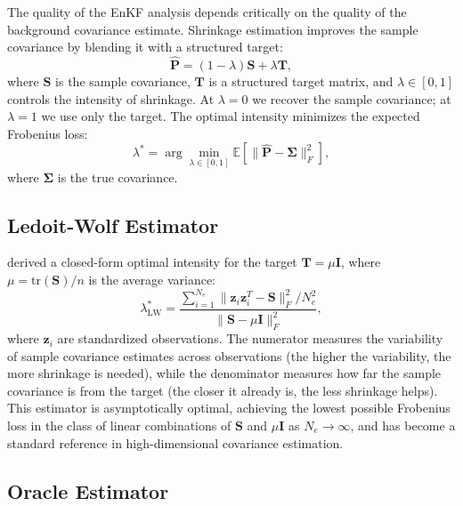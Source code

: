 The quality of the EnKF analysis depends critically on the quality of the background covariance estimate. Shrinkage estimation improves the sample covariance by blending it with a structured target:
\begin{equation}
\label{eq:shrinkage_cov}
\hat{\mathbf{P}} = (1 - \lambda) \mathbf{S} + \lambda \mathbf{T},
\end{equation}
where $\mathbf{S}$ is the sample covariance, $\mathbf{T}$ is a structured target matrix, and $\lambda \in [0,1]$ controls the intensity of shrinkage. At $\lambda = 0$ we recover the sample covariance; at $\lambda = 1$ we use only the target. The optimal intensity minimizes the expected Frobenius loss:
\begin{equation}
\label{eq:optimal_lambda}
\lambda^* = \arg\min_{\lambda \in [0,1]} \mathbb{E}\left[\|\hat{\mathbf{P}} - \boldsymbol{\Sigma}\|_F^2\right],
\end{equation}
where $\boldsymbol{\Sigma}$ is the true covariance.

\subsection{Ledoit-Wolf Estimator}
\label{sec:lw}

\citep{ledoit2004well} derived a closed-form optimal intensity for the target $\mathbf{T} = \mu \mathbf{I}$, where $\mu = \text{tr}(\mathbf{S})/n$ is the average variance:
\begin{equation}
\label{eq:lw_lambda}
\lambda^*_{\text{LW}} = \frac{\sum_{i=1}^{N_e} \|\mathbf{z}_i \mathbf{z}_i^T - \mathbf{S}\|_F^2 / N_e^2}{\|\mathbf{S} - \mu\mathbf{I}\|_F^2},
\end{equation}
where $\mathbf{z}_i$ are standardized observations. The numerator measures the variability of sample covariance estimates across observations (the higher the variability, the more shrinkage is needed), while the denominator measures how far the sample covariance is from the target (the closer it already is, the less shrinkage helps). This estimator is asymptotically optimal, achieving the lowest possible Frobenius loss in the class of linear combinations of $\mathbf{S}$ and $\mu\mathbf{I}$ as $N_e \to \infty$, and has become a standard reference in high-dimensional covariance estimation.

\subsection{Oracle Estimator}
\label{sec:oracle}

